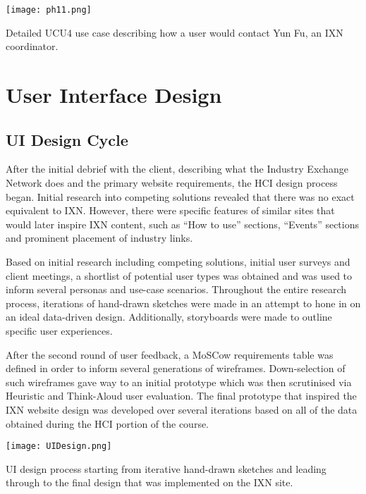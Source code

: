 \documentclass[fontsize=11pt]{extarticle}
\numberwithin{figure}{section} %
\begin{document}
\begin{table}[H]
      \centering
      \texttt{[image: ph11.png]}
      \caption{Detailed UCU4 use case describing how a user would contact Yun Fu, an IXN coordinator. }
 \end{table}

\hypertarget{user-interface-design}{%
\section{User Interface Design}\label{user-interface-design}}

\hypertarget{ui-design-cycle}{%
\subsection{UI Design Cycle}\label{ui-design-cycle}}

After the initial debrief with the client, describing what the Industry
Exchange Network does and the primary website requirements, the HCI
design process began. Initial research into competing solutions revealed
that there was no exact equivalent to IXN. However, there were specific
features of similar sites that would later inspire IXN content, such as
``How to use'' sections, ``Events'' sections and prominent placement of
industry links.

Based on initial research including competing solutions, initial user
surveys and client meetings, a shortlist of potential user types was
obtained and was used to inform several personas and use-case scenarios.
Throughout the entire research process, iterations of hand-drawn
sketches were made in an attempt to hone in on an ideal data-driven
design. Additionally, storyboards were made to outline specific user
experiences.

After the second round of user feedback, a MoSCow requirements table was
defined in order to inform several generations of wireframes.
Down-selection of such wireframes gave way to an initial prototype which
was then scrutinised via Heuristic and Think-Aloud user evaluation. The
final prototype that inspired the IXN website design was developed over
several iterations based on all of the data obtained during the HCI
portion of the course.

\begin{table}[H]
\centering
\texttt{[image: UIDesign.png]}
\caption{UI design process starting from iterative hand-drawn sketches and leading through to the final design that was implemented on the IXN site.}
\label{UIDesign}
\end{table}
\end{document}
